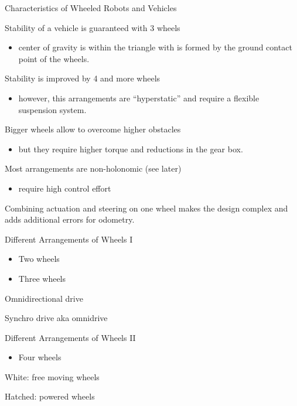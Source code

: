 \documentclass[compress]{beamer}
\begin{document}
\begin{frame}{Characteristics of Wheeled Robots and Vehicles}

Stability of a vehicle is guaranteed with 3 wheels

\begin{itemize}
    \item center of gravity is within the triangle with is formed by the ground
  contact point of the wheels.
\end{itemize}

Stability is improved by 4 and more wheels

\begin{itemize}
    \item however, this arrangements are ``hyperstatic'' and require a flexible
  suspension system.
\end{itemize}

Bigger wheels allow to overcome higher obstacles

\begin{itemize}
    \item but they require higher torque and reductions in the gear box.
\end{itemize}

Most arrangements are non-holonomic (see later)

\begin{itemize}
    \item require high control effort
\end{itemize}

Combining actuation and steering on one wheel makes the design complex
and adds additional errors for odometry.

\end{frame}

\begin{frame}{Different Arrangements of Wheels I}

\begin{itemize}
    \item Two wheels
    \item Three wheels
\end{itemize}

Omnidirectional drive

Synchro drive aka omnidrive

\end{frame}

\begin{frame}{Different Arrangements of Wheels II}

\begin{itemize}
    \item Four wheels
\end{itemize}

White: free moving wheels

Hatched: powered wheels

\end{frame}
\end{document}

